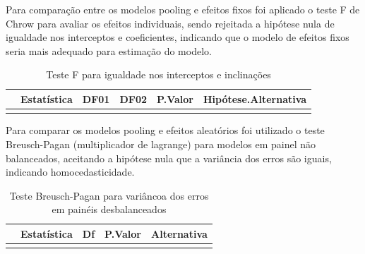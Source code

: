 \documentclass[
  12pt,
  12pt,
  openright,
  oneside,
  a4paper,
  chapter=TITLE,
  section=TITLE,
  subsection=TITLE,
  subsubsection=TITLE,
  english,
  portugues,
  sumario=tradicional]{abntex2}
\begin{document}
Para comparação entre os modelos pooling e efeitos fixos foi aplicado o teste F de Chrow para avaliar os efeitos individuais, sendo rejeitada a hipótese nula de igualdade nos interceptos e coeficientes, indicando que o modelo de efeitos fixos seria mais adequado para estimação do modelo.

\vspace{20pt}

\begin{table}[!hbtp]
\caption{Teste F para igualdade nos interceptos e inclinações}
\vspace{1mm}
\begingroup\fontsize{10}{12}\selectfont

\begin{tabu} to 
\toprule
  & Estatística & DF01 & DF02 & P.Valor & Hipótese.Alternativa\\
\midrule
{} &  &  &  &  & \\
\bottomrule
\end{tabu}
\endgroup{}
\vspace{-1mm}
\label{tb:pftest}
\vspace{-2mm}
\end{table}

Para comparar os modelos pooling e efeitos aleatórios foi utilizado o teste Breusch-Pagan (multiplicador de lagrange) para modelos em painel não balanceados, aceitando a hipótese nula que a variância dos erros são iguais, indicando homocedasticidade.

\vspace{20pt}

\begin{table}[!hbtp]
\caption{Teste Breusch-Pagan para variâncoa dos erros em painéis desbalanceados}
\vspace{1mm}
\begingroup\fontsize{10}{12}\selectfont

\begin{tabu} to 
\toprule
  & Estatística & Df & P.Valor & Alternativa\\
\midrule
{} &  &  &  & \\
\bottomrule
\end{tabu}
\endgroup{}
\vspace{-1mm}
\label{tb:lbptest}
\vspace{-2mm}
\end{table}
\end{document}

